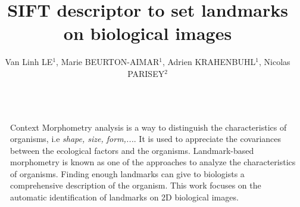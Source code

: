 \documentclass{LaBRI_poster}
\title{SIFT descriptor to set landmarks on biological images}
\author{Van Linh LE$^{1}$, Marie BEURTON-AIMAR$^{1}$, Adrien KRAHENBUHL$^{1}$, Nicolas PARISEY$^{2}$}
\institute{$^{1}$LaBRI - UMR 5800, Univ. Bordeaux; $^{2}$INRA - IGEPP UMR 1349}
\begin{document}
\begin{frame}[t] %

%

\begin{columns}[t] 

\begin{column}{\sepwidth}\end{column} %

\begin{column}{\onecolwidth}
 \begin{alertblock}{Context}
	Morphometry analysis is a way to distinguish the characteristics of organisms, i.e \textit{shape, size, form,...}. It is used to appreciate the covariances between the ecological factors and the organisms. Landmark-based morphometry is known as one of the approaches to analyze the characteristics of organisms. Finding enough landmarks can give to biologists a comprehensive description of the organism. This work focuses on the automatic identification of landmarks on 2D biological images.
 \end{alertblock}
 

\end{column}
\end{columns}
\end{frame}
\end{document}
